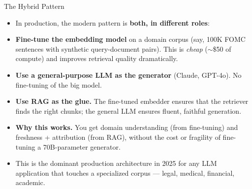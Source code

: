 \begin{frame}{The Hybrid Pattern}
\begin{itemize}
\item In production, the modern pattern is \textbf{both, in different roles}:

\medskip
\item \textbf{Fine-tune the embedding model} on a domain corpus (say, 100K FOMC sentences with synthetic query-document pairs). This is \emph{cheap} ($\sim$\$50 of compute) and improves retrieval quality dramatically.

\medskip
\item \textbf{Use a general-purpose LLM as the generator} (Claude, GPT-4o). No fine-tuning of the big model.

\medskip
\item \textbf{Use RAG as the glue.} The fine-tuned embedder ensures that the retriever finds the right chunks; the general LLM ensures fluent, faithful generation.

\medskip
\item \textbf{Why this works.} You get domain understanding (from fine-tuning) and freshness + attribution (from RAG), without the cost or fragility of fine-tuning a 70B-parameter generator.

\medskip
\item This is the dominant production architecture in 2025 for any LLM application that touches a specialized corpus --- legal, medical, financial, academic.
\end{itemize}
\end{frame}

